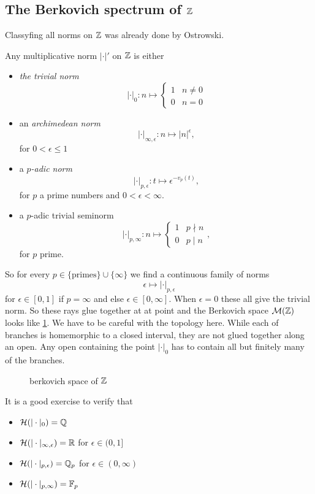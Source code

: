 \subsection{The Berkovich spectrum of $\mathbb{Z}$} \label{sec:the_berkovich_spectrum_of_z}
Classyfing all norms on $\mathbb{Z}$ was already done by Ostrowski.
\begin{theorem}
	[Ostrowski]
	Any multiplicative norm $|\cdot |'$ on $\mathbb{Z}$ is either
	\begin{itemize}
		\item \emph{the trivial norm} \[
				|\cdot |_0: n \mapsto \begin{cases}
					1 & n \ne 0 \\
					0 & n = 0
				\end{cases}
			\]
		\item an \emph{archimedean norm} \[
				|\cdot |_{\infty, \epsilon}: n \mapsto |n|^{\epsilon},
			\]
			for $0 <  \epsilon \le 1$
		\item a \emph{$p$-adic norm} \[
				|\cdot |_{p, \epsilon}: t \mapsto \epsilon ^{- v_p(t)},
			\]
			for $p$ a prime numbers and $0 < \epsilon < \infty$. 
		\item a $p$-adic trivial seminorm 
			\[
			|\cdot |_{p, \infty}: n \mapsto \begin{cases}
				1 & p \nmid n \\
				0 & p \mid n
			\end{cases}
			,\] 
			for $p$ prime. 
	\end{itemize}
\end{theorem}
So for every $p \in \{\text{primes}\} \cup \{\infty\} $ we find a continuous family of norms \[
	\epsilon \mapsto|\cdot |_{p, \epsilon}
\] 
for $\epsilon \in [0, 1]$ if $p = \infty$ and else $\epsilon \in [0, \infty]$. 
When $\epsilon = 0$ these all give the trivial norm. 
So these rays glue together at at point and the Berkovich space $\mathcal{M} (\mathbb{Z})$ looks like \cref{fig:berkovich-space-of-z}.
We have to be careful with the topology here. 
While each of branches is homemorphic to a closed interval, they are not glued together along an open. 
Any open containing the point $|\cdot |_0$ has to contain all but finitely many of the branches. 

\begin{figure}[h]
    \centering
    \caption{berkovich space of $\mathbb{Z}$}
    \label{fig:berkovich-space-of-z}
\end{figure}


It is a good exercise to verify that 
\begin{itemize}
	\item  $\mathcal{H}(|\cdot |_0) = \mathbb{Q}$ 
	\item $\mathcal{H} (|\cdot |_{\infty, \epsilon}) = \mathbb{R}$ for $\epsilon \in (0, 1]$
	\item $\mathcal{H} (|\cdot |_{p, \epsilon}) = \mathbb{Q}_p$ for $\epsilon \in (0, \infty)$
	\item $\mathcal{H} (|\cdot |_{p, \infty}) = \mathbb{F}_p$ 
\end{itemize}



